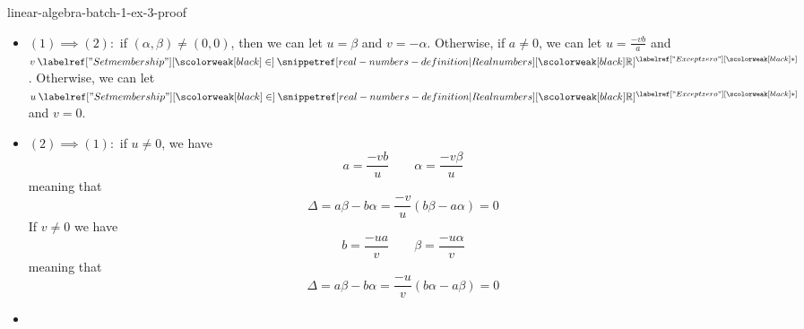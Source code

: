\documentclass[preview]{standalone}
\begin{document}
\begin{snippetsolution}{linear-algebra-batch-1-ex-3-proof}{}
    \begin{itemize}
        \item \((1) \implies (2):\) if \((\alpha, \beta) \neq (0,0)\), then
        we can let \(u = \beta\) and \(v = -\alpha\). Otherwise,
        if \(a \neq 0\), we can let \(u = \frac{-vb}{a}\) and \(v\in\realnumbers^\exceptzero\).
        Otherwise, we can let \(u \in\realnumbers^\exceptzero\) and \(v = 0\).
        \item \((2) \implies (1):\) if \(u\neq 0\), we have
        \[
            a = \frac{-vb}{u}
            \qquad
            \alpha = \frac{-v\beta}{u}
        \]
        meaning that \[
            \Delta = a\beta - b\alpha = \frac{-v}{u}(b\beta - a\alpha) = 0
        \]
        If \(v \neq 0\) we have
        \[
            b = \frac{-ua}{v}
            \qquad
            \beta = \frac{-u\alpha}{v}
        \]
        meaning that
        \[
            \Delta = a\beta - b\alpha = \frac{-u}{v}(b\alpha - a\beta) = 0
        \]
        \item \todo
    \end{itemize}
\end{snippetsolution}

%
\end{document}
